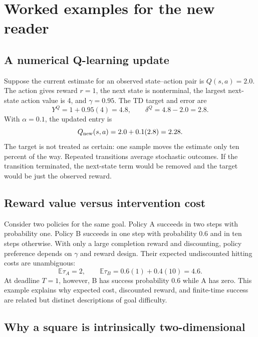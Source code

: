 \documentclass[11pt]{article}
\newcommand{\E}{\mathbb E}
\begin{document}
\section{Worked examples for the new reader}

\subsection{A numerical Q-learning update}

Suppose the current estimate for an observed state--action pair is
$Q(s,a)=2.0$. The action gives reward $r=1$, the next state is nonterminal, the
largest next-state action value is 4, and $\gamma=0.95$. The TD target and error
are
\begin{equation}
 Y^Q=1+0.95(4)=4.8,
 \qquad \delta^Q=4.8-2.0=2.8.
\end{equation}
With $\alpha=0.1$, the updated entry is
\begin{equation}
 Q_{\rm new}(s,a)=2.0+0.1(2.8)=2.28.
\end{equation}
The target is not treated as certain: one sample moves the estimate only ten
percent of the way. Repeated transitions average stochastic outcomes. If the
transition terminated, the next-state term would be removed and the target
would be just the observed reward.

\subsection{Reward value versus intervention cost}

Consider two policies for the same goal. Policy A succeeds in two steps with
probability one. Policy B succeeds in one step with probability $0.6$ and in
ten steps otherwise. With only a large completion reward and discounting,
policy preference depends on $\gamma$ and reward design. Their expected
undiscounted hitting costs are unambiguous:
\begin{equation}
 \E\tau_A=2,
 \qquad
 \E\tau_B=0.6(1)+0.4(10)=4.6.
\end{equation}
At deadline $T=1$, however, B has success probability 0.6 while A has zero.
This example explains why expected cost, discounted reward, and finite-time
success are related but distinct descriptions of goal difficulty.

\subsection{Why a square is intrinsically two-dimensional}
\end{document}
